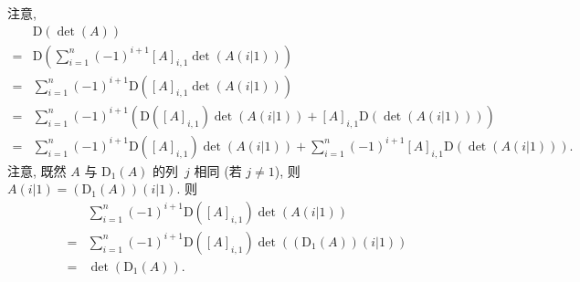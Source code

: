\documentclass[../libro.tex]{subfiles}
\begin{document}
\begin{example}
    注意,
    \begin{align*}
        &
        \mathrm{D} (\det {(A)})
        \\
        = {} &
        \mathrm{D} \left(
            \sum_{i = 1}^{n} {(-1)^{i+1} [A]_{i,1} \det {(A(i|1))}}
        \right)
        \\
        = {} &
        \sum_{i = 1}^{n} {(-1)^{i+1} \mathrm{D} ([A]_{i,1} \det {(A(i|1))})}
        \\
        = {} &
        \sum_{i = 1}^{n} {(-1)^{i+1}
            (\mathrm{D} ([A]_{i,1}) \det {(A(i|1))}
        + [A]_{i,1} \mathrm{D} (\det {(A(i|1))}))}
        \\
        = {} &
        \sum_{i = 1}^{n} {(-1)^{i+1}
        \mathrm{D} ([A]_{i,1}) \det {(A(i|1))}}
        +
        \sum_{i = 1}^{n} {(-1)^{i+1}
        [A]_{i,1} \mathrm{D} (\det {(A(i|1))})}.
    \end{align*}
    注意, 既然 \(A\) 与 \(\mathrm{D}_1 (A)\)
    的列~\(j\) 相同 (若 \(j \neq 1\)),
    则 \(A(i|1) = (\mathrm{D}_1 (A))(i|1)\).
    则
    \begin{align*}
        &
        \sum_{i = 1}^{n} {(-1)^{i+1}
        \mathrm{D} ([A]_{i,1}) \det {(A(i|1))}}
        \\
        = {} &
        \sum_{i = 1}^{n} {(-1)^{i+1}
        \mathrm{D} ([A]_{i,1}) \det {((\mathrm{D}_1 (A))(i|1))}}
        \\
        = {} &
        \det {(\mathrm{D}_1 (A))}.
    \end{align*}


\end{example}
\end{document}
